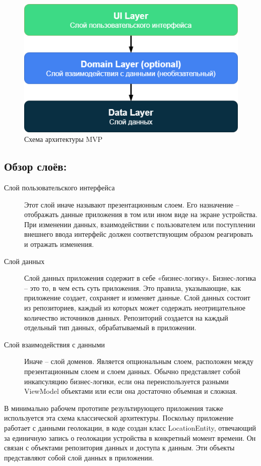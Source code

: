 \begin{figure}[H]
	\centering
	\includegraphics[width=\textwidth]{flesh/arch/uil-dol-dal.png}
	\caption{\label{fig:arch_uil_dol_dal}Схема архитектуры MVP}
\end{figure}

\subsection*{Обзор слоёв:}
\begin{description}
	\item[Слой пользовательского интерфейса] Этот слой иначе называют презентационным слоем. Его назначение – отображать данные приложения в том или ином виде на экране устройства. При изменении данных, взаимодействии с пользователем или поступлении внешнего ввода интерфейс должен соответствующим образом реагировать и отражать изменения.
	\item[Слой данных] Слой данных приложения содержит в себе «бизнес-логику». Бизнес-логика – это то, в чем есть суть приложения. Это правила, указывающие, как приложение создает, сохраняет и изменяет данные.
	Слой данных состоит из репозиториев, каждый из которых может содержать неотрицательное количество источников данных. Репозиторий создается на каждый отдельный тип данных, обрабатываемый в приложении.
	\item[Слой взаимодействия с данными] Иначе – слой доменов. Является опциональным слоем, расположен между презентационным слоем и слоем данных.
	Обычно представляет собой инкапсуляцию бизнес-логики, если она переиспользуется разными ViewModel объектами или если она достаточно объемная и сложная.
\end{description}

В минимально рабочем прототипе результирующего приложения также используется эта схема классической архитектуры.
Поскольку приложение работает с данными геолокации, в коде создан класс LocationEntity, отвечающий за единичную запись о геолокации устройства в конкретный момент времени. 
Он связан с объектами репозитория данных и доступа к данным. 
Эти объекты представляют собой слой данных в приложении.

